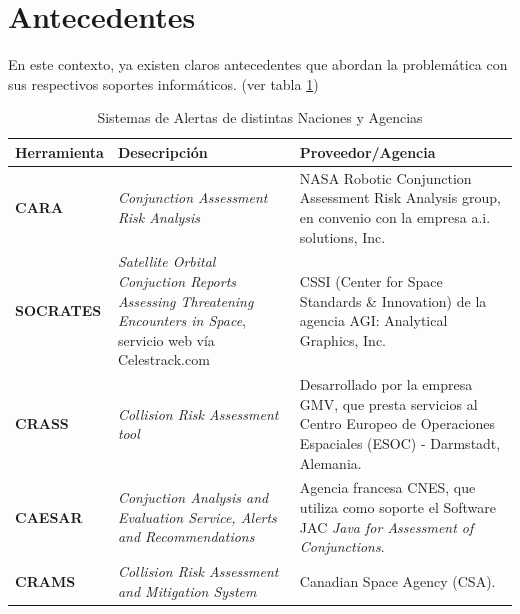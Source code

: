 \section{Antecedentes}
En este contexto, ya existen claros antecedentes que abordan la problem\'atica con sus respectivos soportes inform\'aticos. (ver tabla \ref{tab:sisal})
\begin{table}[!h]
\centering
\begin{tabular}{|l|p{5cm}|p{6cm}|}
\hline
Herramienta & Desecripci\'on & Proveedor/Agencia\\
\hline
{\bf{CARA}} & {\it{Conjunction Assessment Risk Analysis}} & NASA Robotic Conjunction Assessment Risk Analysis group, en convenio con la empresa a.i. solutions, Inc.\\
\hline
{\bf{SOCRATES}} & {\it{Satellite Orbital Conjuction Reports Assessing Threatening Encounters in Space}}, servicio web v\'ia Celestrack.com & CSSI (Center for Space Standards \& Innovation) de la agencia AGI: Analytical Graphics, Inc.\\
\hline
{\bf{CRASS}} & {\it{Collision Risk Assessment tool}} & Desarrollado por la
empresa GMV, que presta servicios al Centro Europeo de Operaciones
Espaciales (ESOC) - Darmstadt, Alemania. \cite{alarconRodriguez}\\
\hline
{\bf{CAESAR}} & {\it{Conjuction Analysis and Evaluation Service, Alerts and Recommendations}} & Agencia francesa CNES, que utiliza como soporte el Software JAC {\it{Java for Assessment of Conjunctions}}.\cite{laporte}\\
\hline
{\bf{CRAMS}} & {\it{Collision Risk Assessment and Mitigation System}} & Canadian Space Agency (CSA). \cite{babiker}\\
\hline
\end{tabular}
\caption[Sistemas de Alerta]{Sistemas de Alertas de distintas Naciones y Agencias}
\label{tab:sisal}
\end{table}

